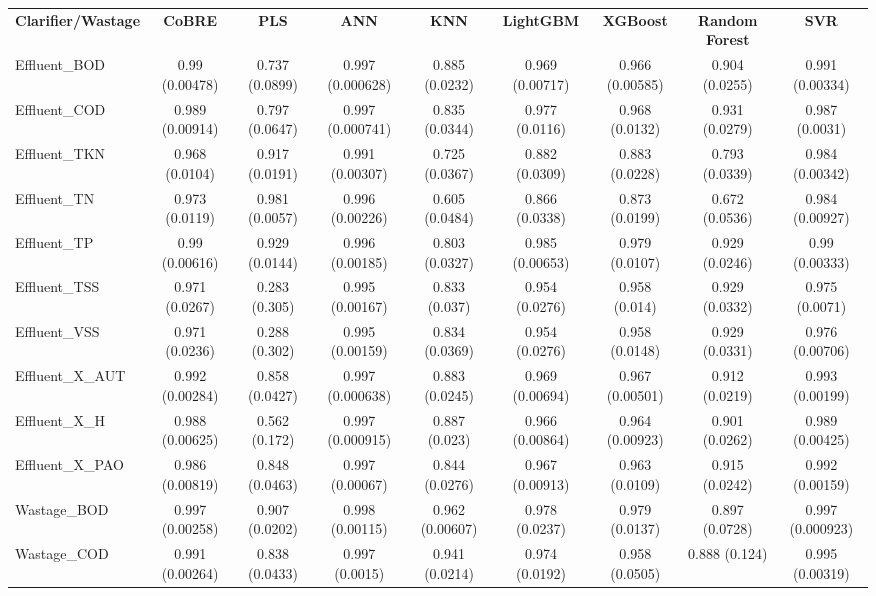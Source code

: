 \documentclass{article}
\begin{document}
\begin{table}[h]
\centering
\scriptsize
\begin{tabular}{lcccccccc}
\textbf{Clarifier/Wastage} & \textbf{CoBRE} & \textbf{PLS} & \textbf{ANN} & \textbf{KNN} & \textbf{LightGBM} & \textbf{XGBoost} & \textbf{Random Forest} & \textbf{SVR} \\
Effluent\_BOD & 0.99 (0.00478) & 0.737 (0.0899) & 0.997 (0.000628) & 0.885 (0.0232) & 0.969 (0.00717) & 0.966 (0.00585) & 0.904 (0.0255) & 0.991 (0.00334) \\
Effluent\_COD & 0.989 (0.00914) & 0.797 (0.0647) & 0.997 (0.000741) & 0.835 (0.0344) & 0.977 (0.0116) & 0.968 (0.0132) & 0.931 (0.0279) & 0.987 (0.0031) \\
Effluent\_TKN & 0.968 (0.0104) & 0.917 (0.0191) & 0.991 (0.00307) & 0.725 (0.0367) & 0.882 (0.0309) & 0.883 (0.0228) & 0.793 (0.0339) & 0.984 (0.00342) \\
Effluent\_TN & 0.973 (0.0119) & 0.981 (0.0057) & 0.996 (0.00226) & 0.605 (0.0484) & 0.866 (0.0338) & 0.873 (0.0199) & 0.672 (0.0536) & 0.984 (0.00927) \\
Effluent\_TP & 0.99 (0.00616) & 0.929 (0.0144) & 0.996 (0.00185) & 0.803 (0.0327) & 0.985 (0.00653) & 0.979 (0.0107) & 0.929 (0.0246) & 0.99 (0.00333) \\
Effluent\_TSS & 0.971 (0.0267) & 0.283 (0.305) & 0.995 (0.00167) & 0.833 (0.037) & 0.954 (0.0276) & 0.958 (0.014) & 0.929 (0.0332) & 0.975 (0.0071) \\
Effluent\_VSS & 0.971 (0.0236) & 0.288 (0.302) & 0.995 (0.00159) & 0.834 (0.0369) & 0.954 (0.0276) & 0.958 (0.0148) & 0.929 (0.0331) & 0.976 (0.00706) \\
Effluent\_X\_AUT & 0.992 (0.00284) & 0.858 (0.0427) & 0.997 (0.000638) & 0.883 (0.0245) & 0.969 (0.00694) & 0.967 (0.00501) & 0.912 (0.0219) & 0.993 (0.00199) \\
Effluent\_X\_H & 0.988 (0.00625) & 0.562 (0.172) & 0.997 (0.000915) & 0.887 (0.023) & 0.966 (0.00864) & 0.964 (0.00923) & 0.901 (0.0262) & 0.989 (0.00425) \\
Effluent\_X\_PAO & 0.986 (0.00819) & 0.848 (0.0463) & 0.997 (0.00067) & 0.844 (0.0276) & 0.967 (0.00913) & 0.963 (0.0109) & 0.915 (0.0242) & 0.992 (0.00159) \\
Wastage\_BOD & 0.997 (0.00258) & 0.907 (0.0202) & 0.998 (0.00115) & 0.962 (0.00607) & 0.978 (0.0237) & 0.979 (0.0137) & 0.897 (0.0728) & 0.997 (0.000923) \\
Wastage\_COD & 0.991 (0.00264) & 0.838 (0.0433) & 0.997 (0.0015) & 0.941 (0.0214) & 0.974 (0.0192) & 0.958 (0.0505) & 0.888 (0.124) & 0.995 (0.00319) \\

\end{tabular}
\end{table}
\end{document}
